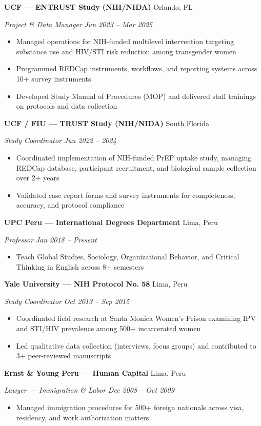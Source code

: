 \documentclass[10pt,letterpaper]{article}
\newcommand{\entry}[4]{%
  \noindent\textbf{#1} \hfill #2 \par\nopagebreak
  \textit{#3} \hfill \textit{#4} \par\nopagebreak
}
\begin{document}
\entry{UCF --- ENTRUST Study (NIH/NIDA)}{Orlando, FL}{Project \& Data Manager}{Jun 2023 -- Mar 2025}
\begin{itemize}
  \item Managed operations for NIH-funded multilevel intervention targeting substance use and HIV/STI risk reduction among transgender women
  \item Programmed REDCap instruments, workflows, and reporting systems across 10+ survey instruments
  \item Developed Study Manual of Procedures (MOP) and delivered staff trainings on protocols and data collection
\end{itemize}
\vspace{0.2em}

\entry{UCF / FIU --- TRUST Study (NIH/NIDA)}{South Florida}{Study Coordinator}{Jun 2022 -- 2024}
\begin{itemize}
  \item Coordinated implementation of NIH-funded PrEP uptake study, managing REDCap database, participant recruitment, and biological sample collection over 2+ years
  \item Validated case report forms and survey instruments for completeness, accuracy, and protocol compliance
\end{itemize}
\vspace{0.2em}

\entry{UPC Peru --- International Degrees Department}{Lima, Peru}{Professor}{Jan 2018 -- Present}
\begin{itemize}
  \item Teach Global Studies, Sociology, Organizational Behavior, and Critical Thinking in English across 8+ semesters
\end{itemize}
\vspace{0.2em}

\entry{Yale University --- NIH Protocol No. 58}{Lima, Peru}{Study Coordinator}{Oct 2013 -- Sep 2015}
\begin{itemize}
  \item Coordinated field research at Santa Monica Women's Prison examining IPV and STI/HIV prevalence among 500+ incarcerated women
  \item Led qualitative data collection (interviews, focus groups) and contributed to 3+ peer-reviewed manuscripts
\end{itemize}
\vspace{0.2em}

\entry{Ernst \& Young Peru --- Human Capital}{Lima, Peru}{Lawyer --- Immigration \& Labor}{Dec 2008 -- Oct 2009}
\begin{itemize}
  \item Managed immigration procedures for 500+ foreign nationals across visa, residency, and work authorization matters
\end{itemize}
\vspace{0.2em}
\end{document}
